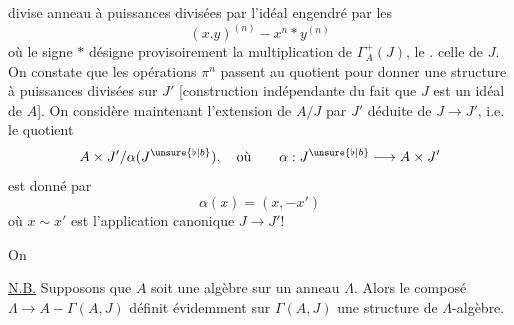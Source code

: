divise  anneau à puissances divisées par l'idéal engendré par les
\[
(x.y)^{(n)}-x^n*y^{(n)}
\]
où le signe $*$ désigne provisoirement la multiplication de $\Gamma_A^+(J)$, le $.$ celle de $J$. On constate que les opérations $\pi^n$ passent au quotient  pour donner une structure  à puissances divisées sur $J'$ [construction indépendante du fait que $J$ est un idéal de $A$]. On considère maintenant l'extension de $A/J$ par  $J'$ déduite de $J\longrightarrow J'$, i.e. le quotient
\[
A\times J'/\alpha(J^{\unsure{\flat|b}}),\quad\text{où}\qquad
\alpha:J^{\unsure{\flat|b}}\longrightarrow A\times J'
\]
est donné par
\[
\alpha(x)=(x,-x')
\]
où $x\sim x'$ est l'application canonique $J\longrightarrow J'!$


On  

\uline{N.B.} Supposons que $A$ soit une algèbre sur un anneau $\Lambda$. Alors le composé $\Lambda\longrightarrow A-\Gamma(A,J)$ définit évidemment sur $\Gamma(A,J)$ une structure de $\Lambda$-algèbre.
